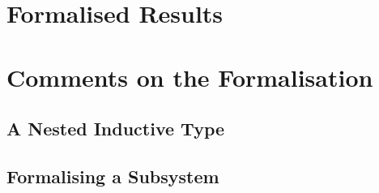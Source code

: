 \section{Formalised Results}

\begin{theorem}
\end{theorem}

\begin{theorem}[Conservativeness]
\end{theorem}

\section{Comments on the Formalisation}
\subsection{A Nested Inductive Type}
\subsection{Formalising a Subsystem}

